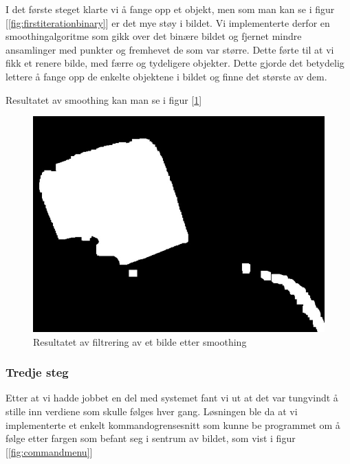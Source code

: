 I det første steget klarte vi å fange opp et objekt, men som man kan se i figur [\ref{fig:firstiterationbinary}] er det mye støy i bildet. Vi implementerte derfor en smoothingalgoritme som gikk over det binære bildet og fjernet mindre ansamlinger med punkter og fremhevet de som var større. Dette førte til at vi fikk et renere bilde, med færre og tydeligere objekter. Dette gjorde det betydelig lettere å fange opp de enkelte objektene i bildet og finne det største av dem.

Resultatet av smoothing kan man se i figur [\ref{fig:seconditerationbinary}] 

\begin{figure}[h!]
	\centering
	\includegraphics[scale=0.45]{img/second-binary.jpg}
	\caption[Andre iterasjon binært bilde]{Resultatet av filtrering av et bilde etter smoothing}
	\label{fig:seconditerationbinary}
\end{figure}

\subsubsection{Tredje steg}

Etter at vi hadde jobbet en del med systemet fant vi ut at det var tungvindt å stille inn verdiene som skulle følges hver gang. Løsningen ble da at vi implementerte et enkelt kommandogrensesnitt som kunne be programmet om å følge etter fargen som befant seg i sentrum av bildet, som vist i figur [\ref{fig:commandmenu}]

